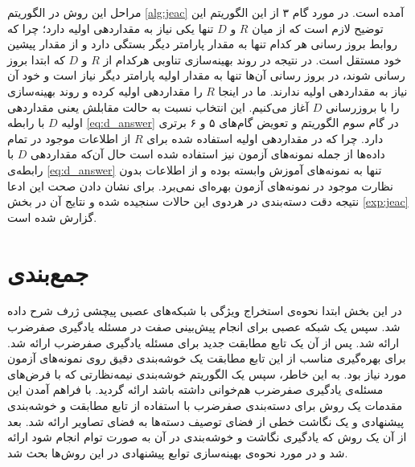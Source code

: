 مراحل این روش در الگوریتم \ref{alg:jeac} آمده است. در مورد گام ۳ از این الگوریتم این توضیح لازم است که از میان $R$ و $D$ تنها یکی نیاز به مقداردهی اولیه دارد؛ چرا که روابط بروز رسانی هر کدام تنها به مقدار پارامتر دیگر بستگی دارد و از مقدار پیشین خود مستقل است. در نتیجه در روند بهینه‌سازی تناوبی هرکدام از $R$ و $D$ که ابتدا بروز رسانی شوند، در بروز رسانی آن‌ها تنها به مقدار اولیه پارامتر دیگر نیاز است و خود آن نیاز به مقداردهی اولیه ندارند. ما در اینجا $R$ را مقداردهی اولیه کرده و روند بهینه‌سازی را با بروزرسانی $D$ آغاز می‌کنیم. این انتخاب نسبت به حالت مقابلش یعنی مقداردهی اولیه $D$ با رابطه
\eqref{eq:d_answer}
 در گام سوم الگوریتم و تعویض گام‌های ۵ و ۶ برتری دارد. چرا که در مقداردهی اولیه استفاده شده برای $R$ از اطلاعات موجود در تمام داده‌ها از جمله نمونه‌های آزمون نیز استفاده شده است حال آن‌که مقداردهی $D$ با رابطه‌ی \eqref{eq:d_answer} تنها به نمونه‌های آموزش وابسته بوده و از اطلاعات بدون نظارت موجود در نمونه‌های آزمون بهره‌ای نمی‌برد. برای نشان دادن صحت این ادعا نتیجه دقت دسته‌بندی در هردوی این حالات سنجیده شده و نتایج آن در بخش  \ref{exp:jeac} گزارش شده است.
\section{جمع‌بندی}
در این بخش ابتدا نحوه‌ی استخراج ویژگی با شبکه‌های عصبی پیچشی ژرف شرح داده شد. سپس یک شبکه عصبی برای انجام پیش‌بینی صفت در مسئله یادگیری صفرضرب ارائه شد. پس از آن یک تابع مطابقت جدید برای مسئله یادگیری صفرضرب ارائه شد. برای بهره‌گیری مناسب از این تابع مطابقت یک خوشه‌بندی دقیق روی نمونه‌های آزمون مورد نیاز بود. به این خاطر، سپس یک الگوریتم خوشه‌بندی نیمه‌نظارتی که با فرض‌های مسئله‌ی یادگیری صفرضرب هم‌خوانی داشته باشد ارائه گردید. با فراهم آمدن این مقدمات یک روش برای دسته‌بندی صفرضرب با استفاده از تابع مطابقت و خوشه‌بندی پیشنهادی و یک نگاشت خطی از فضای توصیف دسته‌ها به فضای تصاویر ارائه شد. بعد از آن یک روش که یادگیری نگاشت و خوشه‌بندی در آن  به صورت توام انجام شود ارائه شد و در مورد نحوه‌ی بهینه‌سازی توابع پیشنهادی در این روش‌ها بحث شد.
